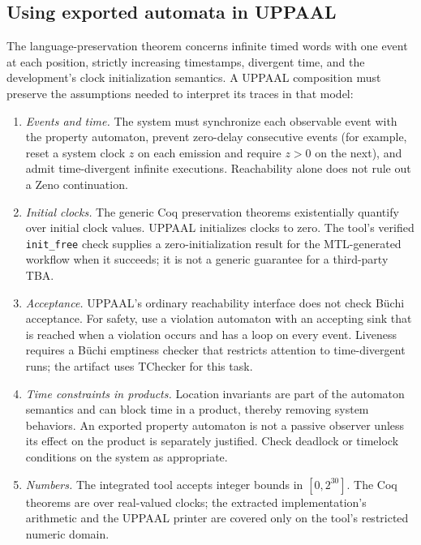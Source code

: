 \documentclass{ieeeaccess}
\begin{document}
\subsection{Using exported automata in UPPAAL}
The language-preservation theorem concerns infinite timed words with one
event at each position, strictly increasing timestamps, divergent time, and
the development's clock initialization semantics. A UPPAAL composition must
preserve the assumptions needed to interpret its traces in that model:
\begin{enumerate}[label=(C\arabic*),leftmargin=*]
  \item \emph{Events and time.} The system must synchronize each observable
        event with the property automaton, prevent zero-delay consecutive
        events (for example, reset a system clock $z$ on each emission and
        require $z>0$ on the next), and admit time-divergent infinite
        executions. Reachability alone does not rule out a Zeno continuation.
  \item \emph{Initial clocks.} The generic Coq preservation theorems
        existentially quantify over initial clock values. UPPAAL initializes
        clocks to zero. The tool's verified \texttt{init\_free} check supplies
        a zero-initialization result for the MTL-generated workflow when it
        succeeds; it is not a generic guarantee for a third-party TBA.
  \item \emph{Acceptance.} UPPAAL's ordinary reachability interface does not
        check B\"uchi acceptance. For safety, use a violation automaton with
        an accepting sink that is reached when a violation occurs and has a
        loop on every event. Liveness requires a B\"uchi emptiness checker
        that restricts attention to time-divergent runs; the artifact uses
        TChecker for this task.
  \item \emph{Time constraints in products.} Location invariants are part of
        the automaton semantics and can block time in a product, thereby
        removing system behaviors. An exported property automaton is not a
        passive observer unless its effect on the product is separately
        justified. Check deadlock or timelock conditions on the system as
        appropriate.
  \item \emph{Numbers.} The integrated tool accepts integer bounds in
        $[0,2^{30}]$. The Coq theorems are over real-valued clocks; the
        extracted implementation's arithmetic and the UPPAAL printer are
        covered only on the tool's restricted numeric domain.
\end{enumerate}
\end{document}
